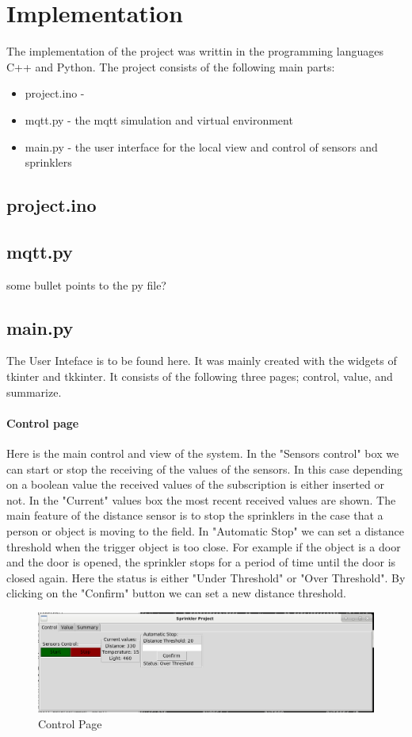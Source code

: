 \documentclass{article}
\begin{document}
\section{Implementation}
The implementation of the project was writtin in the programming languages C++ and Python. The project consists of the following main parts:
\begin{itemize}
    \item project.ino - 
	\item mqtt.py - the mqtt simulation and virtual environment 
	\item main.py - the user interface for the local view and control of sensors and sprinklers
\end{itemize}
\subsection{project.ino}
\subsection{mqtt.py}
some bullet points to the py file?
\subsection{main.py}
The User Inteface is to be found here. It was mainly created with the widgets of tkinter and tkkinter. It consists of the following three pages; control, value, and summarize.
\paragraph{Control page}
Here is the main control and view of the system. In the "Sensors control" box we can start or stop the receiving of the values of the sensors. In this case depending on a boolean value the received values of the subscription is either inserted or not. In the "Current" values box the most recent received values are shown. The main feature of the distance sensor is to stop the sprinklers in the case that a person or object is moving to the field. In "Automatic Stop" we can set a distance threshold when the trigger object is too close. For example if the object is a door and the door is opened, the sprinkler stops for a period of time until the door is closed again. Here the status is either "Under Threshold" or "Over Threshold". By clicking on the "Confirm" button we can set a new distance threshold.
\begin{figure}
    \centering
	\includegraphics[scale=0.3]{control_view.png}
	\caption{Control Page}
	\label{fig:control}
\end{figure}
\end{document}
